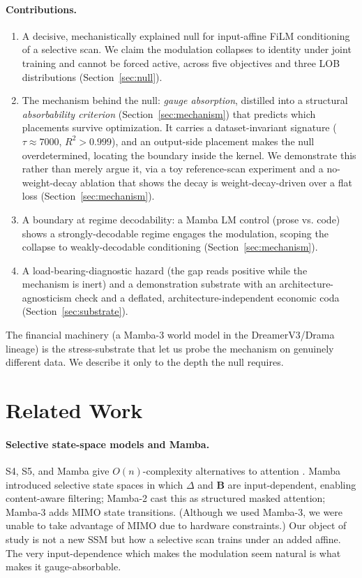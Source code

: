 \documentclass{article}
\begin{document}
\paragraph{Contributions.}
\begin{enumerate}[leftmargin=*]
\item A decisive, mechanistically explained null for input-affine FiLM conditioning of a selective scan. We claim the modulation collapses to identity under joint training and cannot be forced active, across five objectives and three LOB distributions (Section~\ref{sec:null}).
\item The mechanism behind the null: \emph{gauge absorption}, distilled into a structural \emph{absorbability criterion} (Section~\ref{sec:mechanism}) that predicts which placements survive optimization. It carries a dataset-invariant signature ($\tau\approx7000$, $R^2>0.999$), and an output-side placement makes the null overdetermined, locating the boundary inside the kernel. We demonstrate this rather than merely argue it, via a toy reference-scan experiment and a no-weight-decay ablation that shows the decay is weight-decay-driven over a flat loss (Section~\ref{sec:mechanism}).
\item A boundary at regime decodability: a Mamba LM control (prose vs. code) shows a strongly-decodable regime engages the modulation, scoping the collapse to weakly-decodable conditioning (Section~\ref{sec:mechanism}).
\item A load-bearing-diagnostic hazard (the gap reads positive while the mechanism is inert) and a demonstration substrate with an architecture-agnosticism check and a deflated, architecture-independent economic coda (Section~\ref{sec:substrate}).
\end{enumerate}
The financial machinery (a Mamba-3 world model in the DreamerV3/Drama lineage) is the stress-substrate that let us probe the mechanism on genuinely different data. We describe it only to the depth the null requires.

\section{Related Work}
\paragraph{Selective state-space models and Mamba.} S4, S5, and Mamba give $O(n)$-complexity alternatives to attention \citep{gu2022efficiently,smith2023simplified,gu2024mamba}. Mamba \citep{gu2024mamba} introduced selective state spaces in which $\Delta$ and $\mathbf{B}$ are input-dependent, enabling content-aware filtering; Mamba-2 \citep{dao2024transformers} cast this as structured masked attention; Mamba-3 \citep{lahoti2026mamba3} adds MIMO state transitions. (Although we used Mamba-3, we were unable to take advantage of MIMO due to hardware constraints.) Our object of study is not a new SSM but how a selective scan trains under an added affine. The very input-dependence which makes the modulation seem natural is what makes it gauge-absorbable.
\end{document}
